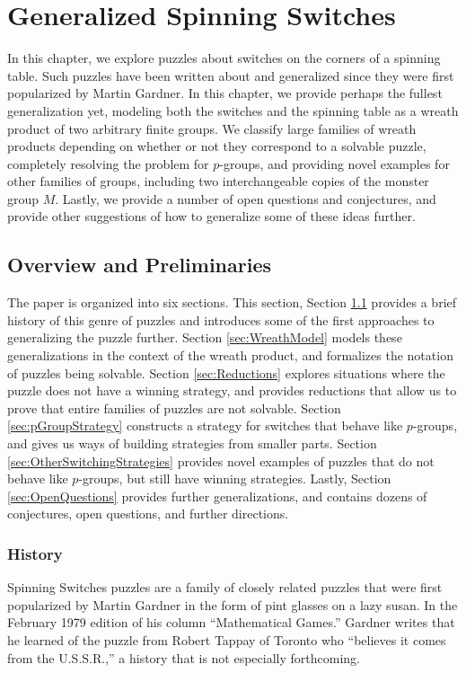 \chapter{Generalized Spinning Switches}
\label{cha:research_topic_1}

In this chapter, we explore puzzles about switches on the corners of a
spinning table. Such puzzles have been written about and generalized since they
were first popularized by Martin Gardner.
In this chapter, we provide perhaps the fullest generalization yet, modeling
both the switches and the spinning table as a wreath product of two arbitrary
finite groups. We classify large families of wreath products depending on
whether or not they correspond to a solvable puzzle, completely resolving the
problem for $p$-groups, and providing novel examples for other families of
groups, including two interchangeable copies of the monster group $M$.
Lastly, we provide a number of open questions and conjectures, and
provide other suggestions of how to generalize some of these ideas further.

\section{Overview and Preliminaries}
\label{sec:overviewAndPreliminaries}
The paper is organized into six sections.
This section,
Section \ref{sec:overviewAndPreliminaries} provides a brief history of this genre of puzzles and introduces some of the first approaches to generalizing the puzzle further.
Section \ref{sec:WreathModel} models these generalizations in the context of the wreath product, and formalizes the notation of puzzles being solvable.
Section \ref{sec:Reductions} explores situations where the puzzle does not have a winning strategy, and provides reductions that allow us to prove that entire families of puzzles are not solvable.
Section \ref{sec:pGroupStrategy} constructs a strategy for switches that behave like $p$-groups, and gives us ways of building strategies from smaller parts.
Section \ref{sec:OtherSwitchingStrategies} provides novel examples of puzzles that do not behave like $p$-groups, but still have winning strategies.
Lastly,
Section \ref{sec:OpenQuestions} provides further generalizations, and contains dozens of conjectures, open questions, and further directions.

\subsection{History}
Spinning Switches puzzles are a family of closely related puzzles
that were first popularized by Martin Gardner in the form of pint glasses
on a lazy susan.
In the February 1979 edition of his column ``Mathematical Games.'' \cite{Gardner1979Problem}
Gardner writes that he learned of the puzzle from Robert Tappay of Toronto who
``believes it comes from the U.S.S.R.,'' a history that is not especially
forthcoming.

